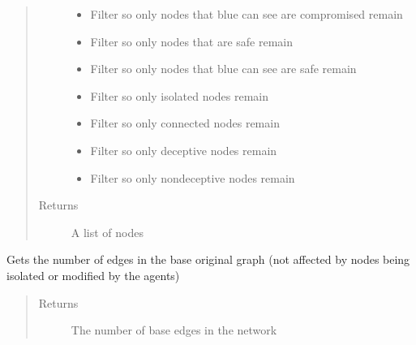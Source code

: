 \documentclass[letterpaper,10pt,english]{sphinxmanual}
\begin{document}
\begin{fulllineitems}
\begin{fulllineitems}
\begin{quote}
\begin{description}
\begin{itemize}
\item {}
\sphinxAtStartPar
{} \textendash{} Filter so only nodes that blue can see are compromised remain

\item {}
\sphinxAtStartPar
{} \textendash{} Filter so only nodes that are safe remain

\item {}
\sphinxAtStartPar
{} \textendash{} Filter so only nodes that blue can see are safe remain

\item {}
\sphinxAtStartPar
{} \textendash{} Filter so only isolated nodes remain

\item {}
\sphinxAtStartPar
{} \textendash{} Filter so only connected nodes remain

\item {}
\sphinxAtStartPar
{} \textendash{} Filter so only deceptive nodes remain

\item {}
\sphinxAtStartPar
{} \textendash{} Filter so only non\sphinxhyphen{}deceptive nodes remain

\end{itemize}

\item[{Returns}] \leavevmode
\sphinxAtStartPar
A list of nodes

\end{description}\end{quote}

\end{fulllineitems}


\begin{fulllineitems}
\label{\detokenize{source/yawning_titan.envs.generic.core:yawning_titan.envs.generic.core.network_interface.NetworkInterface.get_number_base_edges}}
\sphinxAtStartPar
Gets the number of edges in the base original graph (not affected by nodes being isolated or modified by the
agents)
\begin{quote}\begin{description}
\item[{Returns}] \leavevmode
\sphinxAtStartPar
The number of base edges in the network


\end{description}
\end{quote}
\end{fulllineitems}
\end{fulllineitems}
\end{document}
